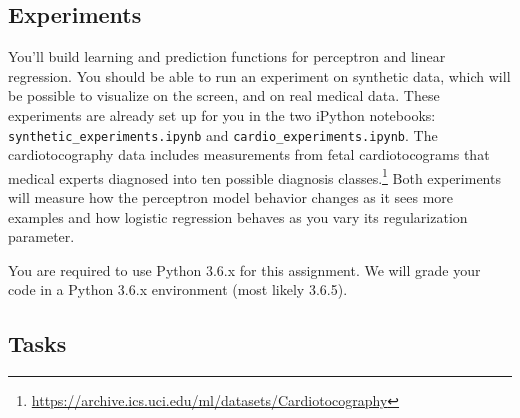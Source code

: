 \documentclass[10pt]{article}
\begin{document}
\subsection*{Experiments}

You'll build learning and prediction functions for perceptron and linear regression. You should be able to run an experiment on synthetic data, which will be possible to visualize on the screen, and on real medical data. These experiments are already set up for you in the two iPython notebooks: \texttt{synthetic\_experiments.ipynb} and \texttt{cardio\_experiments.ipynb}. The cardiotocography data includes measurements from fetal cardiotocograms that medical experts diagnosed into ten possible diagnosis classes.\footnote{\url{https://archive.ics.uci.edu/ml/datasets/Cardiotocography}} Both experiments will measure how the perceptron model behavior changes as it sees more examples and how logistic regression behaves as you vary its regularization parameter. 

You are required to use Python 3.6.x for this assignment. We will grade your code in a Python 3.6.x environment (most likely 3.6.5).

\subsection*{Tasks}
\end{document}
